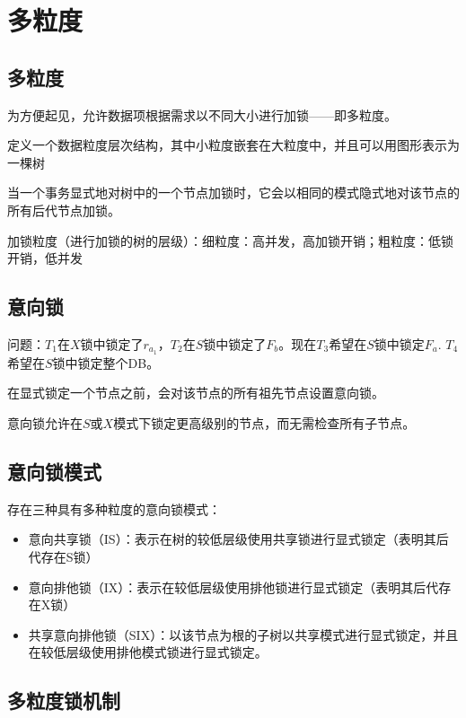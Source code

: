\section{多粒度}

\subsection{多粒度}

为方便起见，允许数据项根据需求以不同大小进行加锁——即多粒度。

定义一个数据粒度层次结构，其中小粒度嵌套在大粒度中，并且可以用图形表示为一棵树

当一个事务显式地对树中的一个节点加锁时，它会以相同的模式隐式地对该节点的所有后代节点加锁。

加锁粒度（进行加锁的树的层级）：细粒度：高并发，高加锁开销；粗粒度：低锁开销，低并发

\subsection{意向锁}

问题：$T_1$在$X$锁中锁定了$r_{a_1}$，$T_2$在$S$锁中锁定了$F_b$。现在$T_3$希望在$S$锁中锁定$F_a$.
$T_4$希望在$S$锁中锁定整个DB。

在显式锁定一个节点之前，会对该节点的所有祖先节点设置意向锁。

意向锁允许在$S$或$X$模式下锁定更高级别的节点，而无需检查所有子节点。

\subsection{意向锁模式}

存在三种具有多种粒度的意向锁模式：
\begin{itemize}
    \item 意向共享锁（IS）：表示在树的较低层级使用共享锁进行显式锁定（表明其后代存在S锁）
    \item 意向排他锁（IX）：表示在较低层级使用排他锁进行显式锁定（表明其后代存在X锁）
    \item 共享意向排他锁（SIX）：以该节点为根的子树以共享模式进行显式锁定，并且在较低层级使用排他模式锁进行显式锁定。
\end{itemize}

\subsection{多粒度锁机制}

